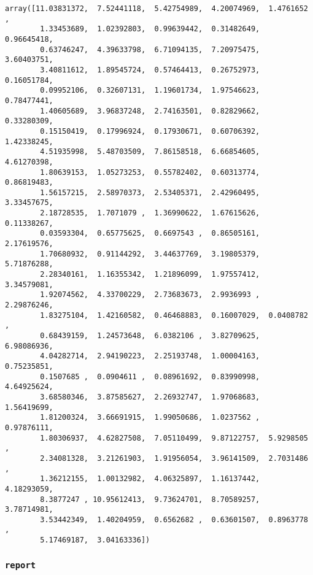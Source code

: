 \documentclass[11pt]{article}
\makeatletter
\newcommand{\boxspacing}{\kern\kvtcb@left@rule\kern\kvtcb@boxsep}
\newcommand{\prompt}[4]{
        {\ttfamily\llap{{\color{#2}[#3]:\hspace{3pt}#4}}\vspace{-\baselineskip}}
    }
\makeatother
\begin{document}
            \begin{tcolorbox}[breakable, size=fbox, boxrule=.5pt, pad at break*=1mm, opacityfill=0]
\prompt{Out}{outcolor}{ }{\boxspacing}
\begin{Verbatim}[commandchars=\\\{\}]
array([11.03831372,  7.52441118,  5.42754989,  4.20074969,  1.4761652 ,
        1.33453689,  1.02392803,  0.99639442,  0.31482649,  0.96645418,
        0.63746247,  4.39633798,  6.71094135,  7.20975475,  3.60403751,
        3.40811612,  1.89545724,  0.57464413,  0.26752973,  0.16051784,
        0.09952106,  0.32607131,  1.19601734,  1.97546623,  0.78477441,
        1.40605689,  3.96837248,  2.74163501,  0.82829662,  0.33280309,
        0.15150419,  0.17996924,  0.17930671,  0.60706392,  1.42338245,
        4.51935998,  5.48703509,  7.86158518,  6.66854605,  4.61270398,
        1.80639153,  1.05273253,  0.55782402,  0.60313774,  0.86819483,
        1.56157215,  2.58970373,  2.53405371,  2.42960495,  3.33457675,
        2.18728535,  1.7071079 ,  1.36990622,  1.67615626,  0.11338267,
        0.03593304,  0.65775625,  0.6697543 ,  0.86505161,  2.17619576,
        1.70680932,  0.91144292,  3.44637769,  3.19805379,  5.71876288,
        2.28340161,  1.16355342,  1.21896099,  1.97557412,  3.34579081,
        1.92074562,  4.33700229,  2.73683673,  2.9936993 ,  2.29876246,
        1.83275104,  1.42160582,  0.46468883,  0.16007029,  0.0408782 ,
        0.68439159,  1.24573648,  6.0382106 ,  3.82709625,  6.98086936,
        4.04282714,  2.94190223,  2.25193748,  1.00004163,  0.75235851,
        0.1507685 ,  0.0904611 ,  0.08961692,  0.83990998,  4.64925624,
        3.68580346,  3.87585627,  2.26932747,  1.97068683,  1.56419699,
        1.81200324,  3.66691915,  1.99050686,  1.0237562 ,  0.97876111,
        1.80306937,  4.62827508,  7.05110499,  9.87122757,  5.9298505 ,
        2.34081328,  3.21261903,  1.91956054,  3.96141509,  2.7031486 ,
        1.36212155,  1.00132982,  4.06325897,  1.16137442,  4.18293059,
        8.3877247 , 10.95612413,  9.73624701,  8.70589257,  3.78714981,
        3.53442349,  1.40204959,  0.6562682 ,  0.63601507,  0.8963778 ,
        5.17469187,  3.04163336])
\end{Verbatim}
\end{tcolorbox}
        
    \hypertarget{report}{%
\subsubsection{\texorpdfstring{\texttt{report}}{report}}\label{report}}
\end{document}
